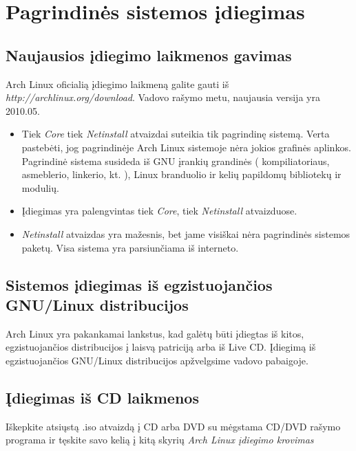 \documentclass[a4paper]{book}
\begin{document}
\chapter{Pagrindinės sistemos įdiegimas}
  \section{Naujausios įdiegimo laikmenos gavimas}

  Arch Linux oficialią įdiegimo laikmeną galite gauti iš
  \textsl{http://archlinux.org/download}. Vadovo rašymo metu,
  naujausia versija yra 2010.05.
  \begin{itemize}
    \item Tiek \textsl{Core} tiek \textsl{Netinstall} atvaizdai
      suteikia tik pagrindinę sistemą. Verta pastebėti, jog
      pagrindinėje Arch Linux sistemoje nėra jokios grafinės
      aplinkos. Pagrindinė sistema susideda iš GNU įrankių grandinės ( kompiliatoriaus,
      asmeblerio, linkerio, kt. ), Linux branduolio ir kelių papildomų
      bibliotekų ir modulių.
    \item Įdiegimas yra palengvintas tiek \textsl{Core}, tiek
      \textsl{Netinstall} atvaizduose.
    \item \textsl{Netinstall} atvaizdas yra mažesnis, bet jame
      visiškai nėra pagrindinės sistemos paketų. Visa sistema yra
      parsiunčiama iš interneto.
  \end{itemize}

  \section{Sistemos įdiegimas iš egzistuojančios GNU/Linux
    distribucijos}

  Arch Linux yra pakankamai lankstus, kad galėtų būti įdiegtas iš
  kitos, egzistuojančios distribucijos į laisvą patriciją arba iš Live
  CD.
  Įdiegimą iš egzistuojančios GNU/Linux distribucijos apžvelgsime
  vadovo pabaigoje.


  \section{Įdiegimas iš CD laikmenos}
  
  Iškepkite atsiųstą .iso atvaizdą į CD arba DVD su mėgstama CD/DVD
  rašymo programa ir tęskite savo kelią į kitą skyrių \textsl{Arch
    Linux įdiegimo krovimas}
\end{document}
